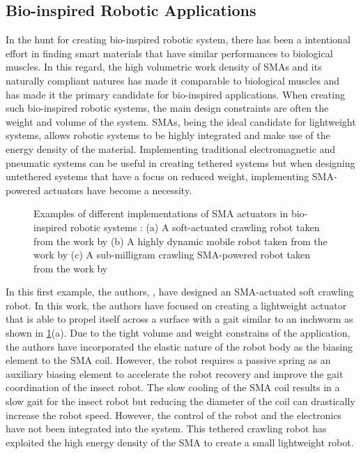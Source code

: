 \subsection{Bio-inspired Robotic Applications}
In the hunt for creating bio-inspired robotic system, there has been a intentional effort in finding smart materials that have similar performances to biological muscles. In this regard, the high volumetric work density of SMAs and its naturally compliant natures has made it comparable to biological muscles and has made it the primary candidate for bio-inspired applications. When creating such bio-inspired robotic systems, the main design constraints are often the weight and volume of the system. SMAs, being the ideal candidate for lightweight systems, allows robotic systems to be highly integrated and make use of the energy density of the material. Implementing traditional electromagnetic and pneumatic systems can be useful in creating tethered systems but when designing untethered systems that have a focus on reduced weight, implementing SMA-powered actuators have become a necessity.

\begin{figure}[hbt!]
    \centering
    
    \caption[Examples of different implementations of SMA actuators in bio-inspired robotic systems]{Examples of different implementations of SMA actuators in bio-inspired robotic systems : (a) A soft-actuated crawling robot taken from the work by \cite{liangShapeMemoryAlloy2020} (b) A highly dynamic mobile robot taken from the work by \cite{huangHighlyDynamicShape2019} (c) A sub-milligram crawling SMA-powered robot taken from the work by \cite{yang88milligramInsectscaleAutonomous2020a}}
    \label{fig:bio-examples}
\end{figure}

In this first example, the authors, \cite{liangShapeMemoryAlloy2020}, have designed an SMA-actuated soft crawling robot. In this work, the authors have focused on creating a lightweight actuator that is able to propel itself across a surface with a gait similar to an inchworm as shown in \cref{fig:bio-examples}(a). Due to the tight volume and weight constrains of the application, the authors have incorporated the elastic nature of the robot body as the biasing element to the SMA coil. However, the robot requires a passive spring as an auxiliary biasing element to accelerate the robot recovery and improve the gait coordination of the insect robot. The slow cooling of the SMA coil results in a slow gait for the insect robot but reducing the diameter of the coil can drastically increase the robot speed. However, the control of the robot and the electronics have not been integrated into the system. This tethered crawling robot has exploited the high energy density of the SMA to create a small lightweight robot.


